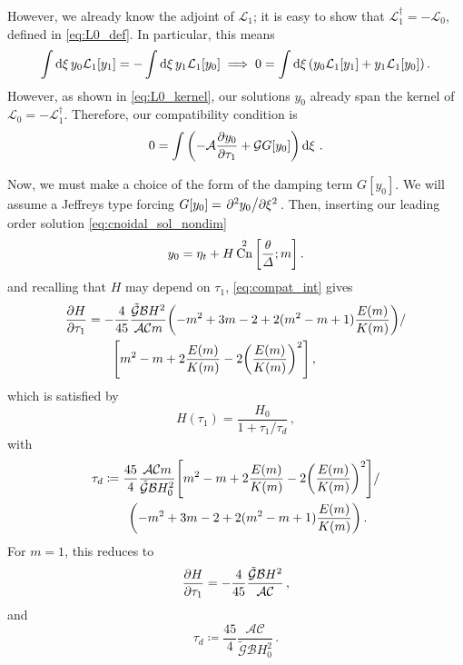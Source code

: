 \documentclass{jfm}
\DeclareMathOperator{\cn}{Cn}
\begin{document}
However, we already know the adjoint of $\mathcal{L}_1$; it is easy
to show that $\mathcal{L}_1^{\dagger} = -\mathcal{L}_0$, defined in
\cref{eq:L0_def}.
In particular, this means
\begin{equation}
  \int \dd{\xi} y_0 \mathcal{L}_1 [y_1]
  = -\int \dd{\xi} y_1 \mathcal{L}_1 [y_0]
  \implies
  0 = \int \dd{\xi} \pqty{y_0 \mathcal{L}_1 [y_1] + y_1
    \mathcal{L}_1 [y_0] } \,.
\end{equation}
However, as shown in \cref{eq:L0_kernel}, our solutions $y_0$
already span the kernel of $\mathcal{L}_0 = -\mathcal{L}_1^{\dagger}$.
Therefore, our compatibility condition is
\begin{equation}
  0 = \int \pqty{- \mathcal{A} \pdv{y_0}{\tau_1} + \mathcal{G} G[y_0]}
  \dd{\xi} \,.
  \label{eq:compat_int}
\end{equation}

Now, we must make a choice of the form of the damping term $G[y_0]$.
We will assume a Jeffreys type forcing $G[y_0] = \pdv*[2]{y_0}{\xi}$.
Then, inserting our leading order solution \cref{eq:cnoidal_sol_nondim}
\begin{equation}
  y_0 = \eta_t + H \cn^2\bqty{\frac{\theta}{\Delta}; m} \,.
\end{equation}
and recalling that $H$ may depend on $\tau_1$, \cref{eq:compat_int} gives
\begin{equation}
  \begin{split}
    \pdv{H}{\tau_1} &= -\frac{4}{45} \frac{\mathcal{\tilde{G}} \mathcal{B}
      H^2}{\mathcal{A} \mathcal{C} m}
      \pqty{-m^2 +3m -2 +2(m^2-m+1) \frac{E(m)}{K(m)}}
      / \\
    &\qquad \bqty{m^2 -m +2\frac{E(m)}{K(m)} -2\pqty{\frac{E(m)}{K(m)}}^2}
      \,,
  \end{split}
\end{equation}
which is satisfied by
\begin{equation}
  H(\tau_1) = \frac{H_0}{1 + \tau_1/\tau_d} \,,
\end{equation}
with
\begin{equation}
  \begin{split}
    \tau_d &\coloneqq \frac{45}{4} \frac{\mathcal{A}
      \mathcal{C} m}{\mathcal{\tilde{G}} \mathcal{B} H_0^2}
      \bqty{m^2-m+2 \frac{E(m)}{K(m)}-2 \pqty{\frac{E(m)}{K(m)}}^2}
      / \\
    &\qquad \pqty{-m^2+3 m-2+2 (m^2-m+1) \frac{E(m)}{K(m)}}
      \,.
  \end{split}
\end{equation}
For $m=1$, this reduces to
\begin{equation}
  \pdv{H}{\tau_1} = -\frac{4}{45} \frac{\mathcal{\tilde{G}} \mathcal{B}
    H^2}{\mathcal{A} \mathcal{C}}
    \,,
\end{equation}
and
\begin{equation}
  \tau_d \coloneqq \frac{45}{4} \frac{\mathcal{A}
    \mathcal{C}}{\mathcal{\tilde{G}} \mathcal{B} H_0^2} \,.
\end{equation}
\end{document}
